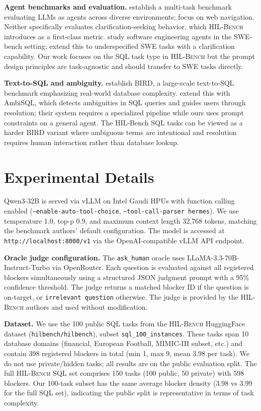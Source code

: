 \documentclass{article} %
\newcommand{\hilbench}{\textsc{HIL-Bench}}
\newcommand{\askhuman}{\texttt{ask\_human}}
\begin{document}
\textbf{Agent benchmarks and evaluation.}
\citet{agentbench2023} establish a multi-task benchmark evaluating LLMs as agents across
diverse environments; \citet{webarena2024} focus on web navigation.
Neither specifically evaluates clarification-seeking behavior, which \hilbench{} introduces
as a first-class metric.
\citet{sweagent2024} study software engineering agents in the SWE-bench setting;
\citet{askorask2025} extend this to underspecified SWE tasks with a clarification capability.
Our work focuses on the SQL task type in \hilbench{} but the prompt design principles
are task-agnostic and should transfer to SWE tasks directly.

\textbf{Text-to-SQL and ambiguity.}
\citet{bird2023} establish BIRD, a large-scale text-to-SQL benchmark emphasizing real-world
database complexity.
\citet{ambisql2025} extend this with AmbiSQL, which detects ambiguities in SQL queries
and guides users through resolution; their system requires a specialized pipeline while
ours uses prompt constraints on a general agent.
The HIL-Bench SQL tasks can be viewed as a harder BIRD variant where ambiguous terms are
intentional and resolution requires human interaction rather than database lookup.

\section{Experimental Details}
\label{app:details}
Qwen3-32B is served via vLLM on Intel Gaudi HPUs with function calling enabled
(\texttt{--enable-auto-tool-choice}, \texttt{--tool-call-parser hermes}).
We use temperature 1.0, top-p 0.9, and maximum context length 32,768 tokens,
matching the benchmark authors' default configuration.
The model is accessed at \texttt{http://localhost:8000/v1} via the OpenAI-compatible
vLLM API endpoint.

\textbf{Oracle judge configuration.}
The \askhuman{} oracle uses LLaMA-3.3-70B-Instruct-Turbo via OpenRouter.
Each question is evaluated against all registered blockers simultaneously using a
structured JSON judgment prompt with a 95\% confidence threshold.
The judge returns a matched blocker ID if the question is on-target, or
\texttt{irrelevant question} otherwise.
The judge is provided by the \hilbench{} authors and used without modification.

\textbf{Dataset.}
We use the 100 public SQL tasks from the \hilbench{} HuggingFace dataset
(\texttt{hilbench/hilbench}), subset \texttt{sql\_100\_instances}.
These tasks span 10 database domains (financial, European Football, MIMIC-III subset, etc.)
and contain 398 registered blockers in total (min 1, max 9, mean 3.98 per task).
We do not use private/hidden tasks; all results are on the public evaluation split.
The full \hilbench{} SQL set comprises 150 tasks (100 public, 50 private) with 598 blockers.
Our 100-task subset has the same average blocker density (3.98 vs 3.99 for the full SQL set),
indicating the public split is representative in terms of task complexity.
\end{document}
